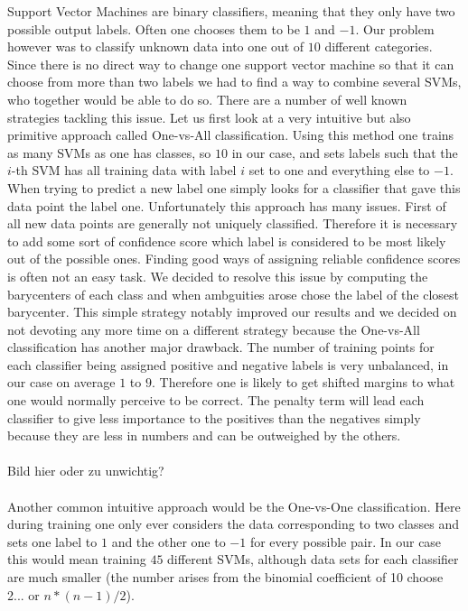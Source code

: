 Support Vector Machines are binary classifiers, meaning that they only have two possible output labels. Often one chooses them to be $1$ and $-1$. Our problem however was to classify unknown data into one out of $10$ different categories. Since there is no direct way to change one support vector machine so that it can choose from more than two labels we had to find a way to combine several SVMs, who together would be able to do so. There are a number of well known strategies tackling this issue. Let us first look at a very intuitive but also primitive approach called One-vs-All classification. Using this method one trains as many SVMs as one has classes, so $10$ in our case, and sets labels such that the $i$-th SVM has all training data with label $i$ set to one and everything else to $-1$. When trying to predict a new label one simply looks for a classifier that gave this data point the label one. Unfortunately this approach has many issues. First of all new data points are generally not uniquely classified. Therefore it is necessary to add some sort of confidence score which label is considered to be most likely out of the possible ones. Finding good ways of assigning reliable confidence scores is often not an easy task. We decided to resolve this issue by computing the barycenters of each class and when ambguities arose chose the label of the closest barycenter. This simple strategy notably improved our results and we decided on not devoting any more time on a different strategy because the One-vs-All classification has another major drawback. The number of training points for each classifier being assigned positive and negative labels is very unbalanced, in our case on average $1$ to $9$. Therefore one is likely to get shifted margins to what one would normally perceive to be correct. The penalty term will lead each classifier to give less importance to the positives than the negatives simply because they are less in numbers and can be outweighed by the others. \\ \\ Bild hier oder zu unwichtig? \\  \\ Another common intuitive approach would be the One-vs-One classification. Here during training one only ever considers the data corresponding to two classes and sets one label to $1$ and the other one to $-1$ for every possible pair. 
In our case this would mean training $45$ different SVMs, although data sets for each classifier are much smaller (the number arises from the binomial coefficient of 10 choose 2... or $n*(n-1)/2$).


